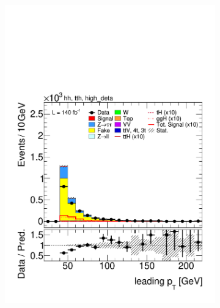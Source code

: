       \begin{figure}[htbp]
        \centering
        \begin{subfigure}[b]{0.45\textwidth}
          \centering
          \includegraphics[width=\textwidth]{images/highdeta_highdeta_run2/plot_tau_0_pt_hh_tth_15_16_17_18_high_deta.pdf}
          \caption{}
        \end{subfigure}
        \hfill
        \begin{subfigure}[b]{0.45\textwidth}
          \centering

\end{subfigure}
\end{figure}
